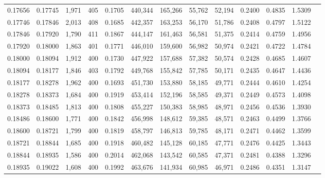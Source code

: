 \begin{tabular}{rrrrrrrrrrrrr}
0.17656 & 0.17745 & 1,971 & 405 &                                     0.1705 & 440,344 & 165,266 &  55,762 &  52,194 & 0.2400 & 0.4835 & 1.5309 \\
0.17746 & 0.17846 & 2,013 & 408 &                                     0.1685 & 442,357 & 163,253 &  56,170 &  51,786 & 0.2408 & 0.4797 & 1.5122 \\
0.17846 & 0.17920 & 1,790 & 411 &                                     0.1867 & 444,147 & 161,463 &  56,581 &  51,375 & 0.2414 & 0.4759 & 1.4956 \\
0.17920 & 0.18000 & 1,863 & 401 &                                     0.1771 & 446,010 & 159,600 &  56,982 &  50,974 & 0.2421 & 0.4722 & 1.4784 \\
0.18000 & 0.18094 & 1,912 & 400 &                                     0.1730 & 447,922 & 157,688 &  57,382 &  50,574 & 0.2428 & 0.4685 & 1.4607 \\
0.18094 & 0.18177 & 1,846 & 403 &                                     0.1792 & 449,768 & 155,842 &  57,785 &  50,171 & 0.2435 & 0.4647 & 1.4436 \\
0.18177 & 0.18278 & 1,962 & 400 &                                     0.1693 & 451,730 & 153,880 &  58,185 &  49,771 & 0.2444 & 0.4610 & 1.4254 \\
0.18278 & 0.18373 & 1,684 & 400 &                                     0.1919 & 453,414 & 152,196 &  58,585 &  49,371 & 0.2449 & 0.4573 & 1.4098 \\
0.18373 & 0.18485 & 1,813 & 400 &                                     0.1808 & 455,227 & 150,383 &  58,985 &  48,971 & 0.2456 & 0.4536 & 1.3930 \\
0.18486 & 0.18600 & 1,771 & 400 &                                     0.1842 & 456,998 & 148,612 &  59,385 &  48,571 & 0.2463 & 0.4499 & 1.3766 \\
0.18600 & 0.18721 & 1,799 & 400 &                                     0.1819 & 458,797 & 146,813 &  59,785 &  48,171 & 0.2471 & 0.4462 & 1.3599 \\
0.18721 & 0.18844 & 1,685 & 400 &                                     0.1918 & 460,482 & 145,128 &  60,185 &  47,771 & 0.2476 & 0.4425 & 1.3443 \\
0.18844 & 0.18935 & 1,586 & 400 &                                     0.2014 & 462,068 & 143,542 &  60,585 &  47,371 & 0.2481 & 0.4388 & 1.3296 \\
0.18935 & 0.19022 & 1,608 & 400 &                                     0.1992 & 463,676 & 141,934 &  60,985 &  46,971 & 0.2486 & 0.4351 & 1.3147 \\

\end{tabular}
